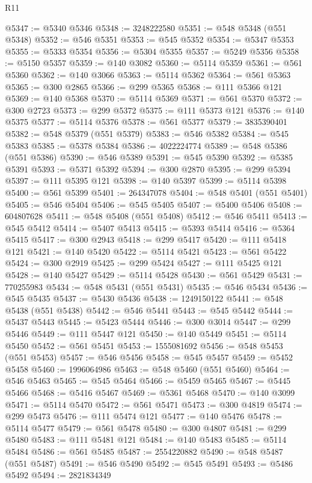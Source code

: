 \begin{lexlean}{R11}
\begin{coremodule}
@5347 := @5340 @5346
@5348 := 3248222580
@5351 := @548 @5348 (@551 @5348)
@5352 := @546 @5351
@5353 := @545 @5352
@5354 := @5347 @5353
@5355 := @5333 @5354
@5356 := @5304 @5355
@5357 := @5249 @5356
@5358 := @5150 @5357
@5359 := @140 @3082
@5360 := @5114 @5359
@5361 := @561 @5360
@5362 := @140 @3066
@5363 := @5114 @5362
@5364 := @561 @5363
@5365 := @300 @2865
@5366 := @299 @5365
@5368 := @111 @5366 @121
@5369 := @140 @5368
@5370 := @5114 @5369
@5371 := @561 @5370
@5372 := @300 @2723
@5373 := @299 @5372
@5375 := @111 @5373 @121
@5376 := @140 @5375
@5377 := @5114 @5376
@5378 := @561 @5377
@5379 := 3835390401
@5382 := @548 @5379 (@551 @5379)
@5383 := @546 @5382
@5384 := @545 @5383
@5385 := @5378 @5384
@5386 := 4022224774
@5389 := @548 @5386 (@551 @5386)
@5390 := @546 @5389
@5391 := @545 @5390
@5392 := @5385 @5391
@5393 := @5371 @5392
@5394 := @300 @2870
@5395 := @299 @5394
@5397 := @111 @5395 @121
@5398 := @140 @5397
@5399 := @5114 @5398
@5400 := @561 @5399
@5401 := 264347078
@5404 := @548 @5401 (@551 @5401)
@5405 := @546 @5404
@5406 := @545 @5405
@5407 := @5400 @5406
@5408 := 604807628
@5411 := @548 @5408 (@551 @5408)
@5412 := @546 @5411
@5413 := @545 @5412
@5414 := @5407 @5413
@5415 := @5393 @5414
@5416 := @5364 @5415
@5417 := @300 @2943
@5418 := @299 @5417
@5420 := @111 @5418 @121
@5421 := @140 @5420
@5422 := @5114 @5421
@5423 := @561 @5422
@5424 := @300 @2919
@5425 := @299 @5424
@5427 := @111 @5425 @121
@5428 := @140 @5427
@5429 := @5114 @5428
@5430 := @561 @5429
@5431 := 770255983
@5434 := @548 @5431 (@551 @5431)
@5435 := @546 @5434
@5436 := @545 @5435
@5437 := @5430 @5436
@5438 := 1249150122
@5441 := @548 @5438 (@551 @5438)
@5442 := @546 @5441
@5443 := @545 @5442
@5444 := @5437 @5443
@5445 := @5423 @5444
@5446 := @300 @3014
@5447 := @299 @5446
@5449 := @111 @5447 @121
@5450 := @140 @5449
@5451 := @5114 @5450
@5452 := @561 @5451
@5453 := 1555081692
@5456 := @548 @5453 (@551 @5453)
@5457 := @546 @5456
@5458 := @545 @5457
@5459 := @5452 @5458
@5460 := 1996064986
@5463 := @548 @5460 (@551 @5460)
@5464 := @546 @5463
@5465 := @545 @5464
@5466 := @5459 @5465
@5467 := @5445 @5466
@5468 := @5416 @5467
@5469 := @5361 @5468
@5470 := @140 @3099
@5471 := @5114 @5470
@5472 := @561 @5471
@5473 := @300 @4819
@5474 := @299 @5473
@5476 := @111 @5474 @121
@5477 := @140 @5476
@5478 := @5114 @5477
@5479 := @561 @5478
@5480 := @300 @4807
@5481 := @299 @5480
@5483 := @111 @5481 @121
@5484 := @140 @5483
@5485 := @5114 @5484
@5486 := @561 @5485
@5487 := 2554220882
@5490 := @548 @5487 (@551 @5487)
@5491 := @546 @5490
@5492 := @545 @5491
@5493 := @5486 @5492
@5494 := 2821834349

\end{coremodule}
\end{lexlean}
